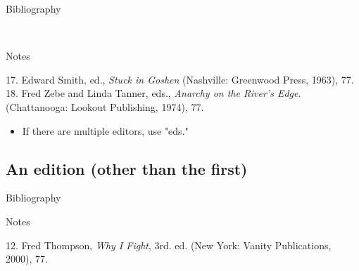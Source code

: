 \begin{center}{Bibliography}\end{center}
\begin{singlespace}
\noindent{}\\

\noindent{}
\end{singlespace}

\begin{center}{Notes}\end{center}
\begin{singlespace}
\hspace{1.2cm}17. Edward Smith, ed., \emph{Stuck in Goshen} (Nashville:
Greenwood Press, 1963), 77.\\

\noindent\hspace{1.2cm}18. Fred Zebe and Linda Tanner, eds., \emph{Anarchy on the River's
Edge}. (Chattanooga: Lookout Publishing, 1974), 77.
\end{singlespace}

\begin{itemize} \item If there are multiple editors, use "eds." \end{itemize}

\subsection{An edition (other than the first)}
\begin{center}{Bibliography}\end{center}

\begin{singlespace}
\noindent{}
\end{singlespace}

\begin{center}{Notes}\end{center}

\begin{singlespace}
\noindent\hspace{1.2cm}12. Fred Thompson, \emph{Why I Fight}, 3rd. ed. (New
York: Vanity Publications, 2000), 77.
\end{singlespace}

